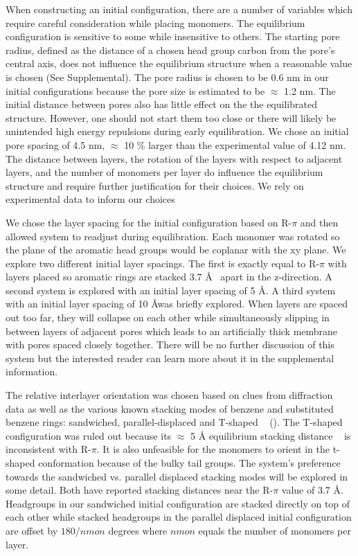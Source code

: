 \documentclass{article}
\newcommand{\angstrom}{\textup{\AA}}
\begin{document}
  When constructing an initial configuration, there are a number of variables
  which require careful consideration while placing monomers. The equilibrium
  configuration is sensitive to some while insensitive to others. The starting
  pore radius, defined as the distance of a chosen head group carbon from the
  pore's central axis, does not influence the equilibrium structure when a
  reasonable value is chosen (See Supplemental). The pore radius is chosen to be
  0.6 nm in our initial configurations because the pore size is estimated to be
  $\approx$ 1.2 nm. The initial distance between pores also has little effect on
  the the equilibrated structure. However, one should not start them too close or
  there will likely be unintended high energy repulsions during early
  equilibration. We chose an initial pore spacing of 4.5 nm, $\approx$ 10 \%
  larger than the experimental value of 4.12 nm.  The distance between layers,
  the rotation of the layers with respect to adjacent layers, and the number of
  monomers per layer do influence the equilibrium structure and require further
  justification for their choices. We rely on experimental data to inform our
  choices

  We chose the layer spacing for the initial configuration based on R-$\pi$ and
  then allowed system to readjust during equilibration. Each monomer was rotated
  so the plane of the aromatic head groups would be coplanar with the xy plane.
  We explore two different initial layer spacings. The first is exactly equal to
  R-$\pi$ with layers placed so aromatic rings are stacked 3.7 \angstrom~ apart
  in the z-direction.  A second system is explored with an initial layer spacing
  of 5 \angstrom. A third system with an initial layer spacing of 10 \angstrom was
  briefly explored. When layers are spaced out too far, they will collapse
  on each other while simultaneously slipping in between layers of adjacent pores
  which leads to an artificially thick membrane with pores spaced closely
  together. There will be no further discussion of this system but the interested
  reader can learn more about it in the supplemental information.

  The relative interlayer orientation was chosen based on clues from
  diffraction data as well as the various known stacking modes of benzene and
  substituted benzene rings: sandwiched, parallel-displaced and T-shaped
  ~\cite{sinnokrot_estimates_2002} ().
  The T-shaped configuration was ruled out because its $\approx$ 5 \angstrom
  equilibrium stacking distance ~\cite{sinnokrot_estimates_2002} is inconsistent
  with R-$\pi$. It is also unfeasible for the monomers to orient in the t-shaped
  conformation because of the bulky tail groups. The system's preference towards
  the sandwiched vs. parallel displaced stacking modes will be explored in some
  detail.  Both have reported stacking distances near the R-$\pi$ value of 3.7
  \angstrom. Headgroups in our sandwiched initial configuration are stacked
  directly on top of each other while stacked headgroups in the parallel
  displaced initial configuration are offset by $180/nmon$ degrees where $nmon$
  equals the number of monomers per layer.
\end{document}
